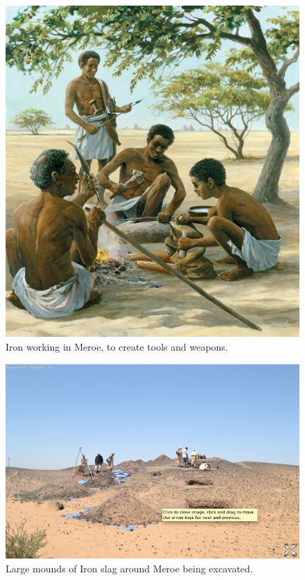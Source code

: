 \documentclass[a4paper,12pt]{scrreprt}
\begin{document}
\begin{figure}[H]
	\centering
	\includegraphics[width=\textwidth]{img/iron_working_drawing}
	\caption{Iron working in Meroe, to create tools and weapons.}
\end{figure}

\begin{figure}[H]
	\centering
	\includegraphics[width=\textwidth]{img/iron_slag_excavated}
	\caption{Large mounds of Iron slag around Meroe being excavated.}
\end{figure}
\end{document}
